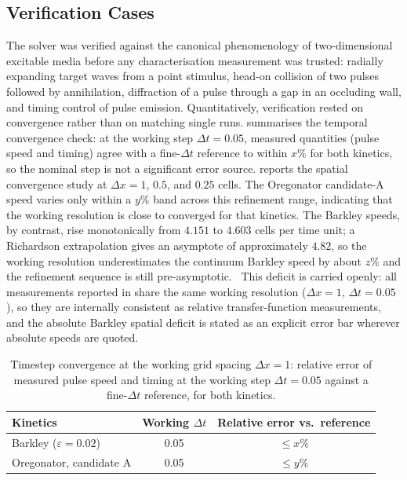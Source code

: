 \subsection{Verification Cases}
\label{sec:meth_verification}

The solver was verified against the canonical phenomenology of two-dimensional excitable media before any characterisation measurement was trusted: radially expanding target waves from a point stimulus, head-on collision of two pulses followed by annihilation, diffraction of a pulse through a gap in an occluding wall, and timing control of pulse emission. 
Quantitatively, verification rested on convergence rather than on matching single runs. 
 summarises the temporal convergence check: at the working step $\Delta t = 0.05$, measured quantities (pulse speed and timing) agree with a fine-$\Delta t$ reference to within $x\%$ for both kinetics, so the nominal step is not a significant error source. 
 reports the spatial convergence study at $\Delta x = 1$, $0.5$, and $0.25$ cells. The Oregonator candidate-A speed varies only within a $y\%$ band across this refinement range, indicating that the working resolution is close to converged for that kinetics. 
The Barkley speeds, by contrast, rise monotonically from $4.151$ to $4.603$ cells per time unit; a Richardson extrapolation gives an asymptote of approximately $4.82$, so the working resolution underestimates the continuum Barkley speed by about $z\%$ and the refinement sequence is still pre-asymptotic. \
This deficit is carried openly: all measurements reported in  share the same working resolution ($\Delta x = 1$, $\Delta t = 0.05$), so they are internally consistent as relative transfer-function measurements, and the absolute Barkley spatial deficit is stated as an explicit error bar wherever absolute speeds are quoted.

\begin{table}[htbp]
\centering
\caption{Timestep convergence at the working grid spacing $\Delta x = 1$: relative error of measured pulse speed and timing at the working step $\Delta t = 0.05$ against a fine-$\Delta t$ reference, for both kinetics.}
\label{tab:timestep_convergence}
\small
\begin{tabular}{@{}lcc@{}}
\toprule
\textbf{Kinetics} & \textbf{Working $\Delta t$} & \textbf{Relative error vs.\ reference} \\
\midrule
Barkley ($\varepsilon = 0.02$) & 0.05 & $\leq x\%$ \\
Oregonator, candidate A & 0.05 & $\leq y\%$ \\
\bottomrule
\end{tabular}
\end{table}

